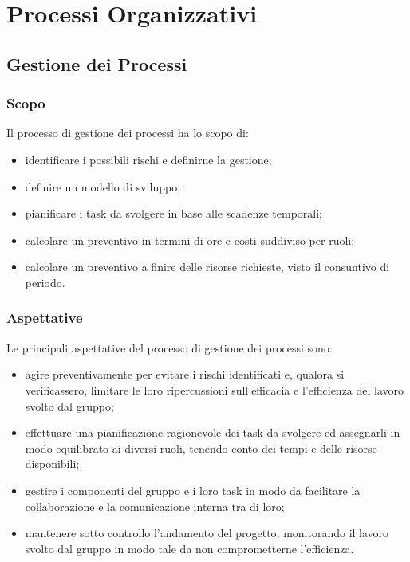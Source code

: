\section{Processi Organizzativi}

\subsection{Gestione dei Processi}

	\subsubsection{Scopo}

		Il processo di gestione dei processi ha lo scopo di:

		\begin{itemize}
			\item identificare i possibili rischi e definirne la gestione;
			\item definire un modello di sviluppo;
			\item pianificare i task da svolgere in base alle scadenze temporali;
			\item calcolare un preventivo in termini di ore e costi suddiviso per ruoli;
			\item calcolare un preventivo a finire delle risorse richieste, visto il consuntivo di periodo.
		\end{itemize}

	\subsubsection{Aspettative}

		Le principali aspettative del processo di gestione dei processi sono:

		\begin{itemize}
			\item agire preventivamente per evitare i rischi identificati e, qualora si verificassero, limitare le loro ripercussioni sull'efficacia e l'efficienza del lavoro svolto dal gruppo;
			\item effettuare una pianificazione ragionevole dei task da svolgere ed assegnarli in modo equilibrato ai diversi ruoli, tenendo conto dei tempi e delle risorse disponibili;
			\item gestire i componenti del gruppo e i loro task in modo da facilitare la collaborazione e la comunicazione interna tra di loro;
			\item mantenere sotto controllo l'andamento del progetto, monitorando il lavoro svolto dal gruppo in modo tale da non comprometterne l'efficienza.
		\end{itemize}

